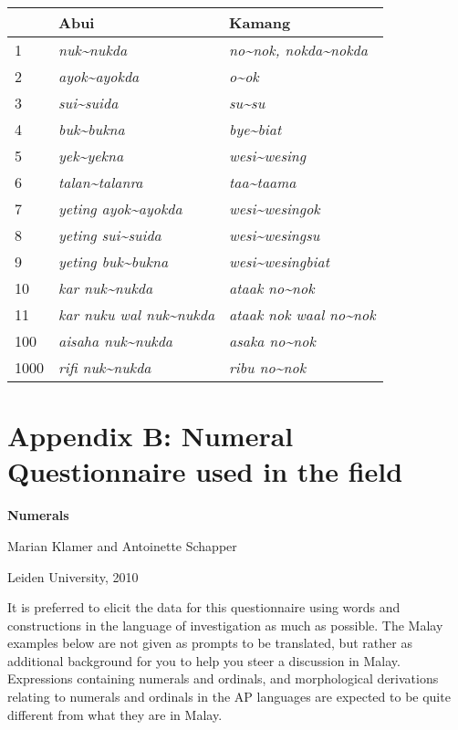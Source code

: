 \begin{center}
\tablehead{}
\begin{supertabular}{m{0.66775984in}m{2.0462599in}m{1.7038599in}}
\hline
 &
Abui &
Kamang\\ &
\textit{nuk\~{}nukda} &
\textit{no\~{}nok, nokda\~{}nokda}\\
2 &
\textit{ayok\~{}ayokda} &
\textit{o\~{}ok\ \ }\\
3 &
\textit{sui\~{}suida} &
\textit{su\~{}su}\\
4 &
\textit{buk\~{}bukna} &
\textit{bye\~{}biat}\\
5 &
\textit{yek\~{}yekna} &
\textit{wesi\~{}wesing}\\
6 &
\textit{talan\~{}talanra} &
\textit{taa\~{}taama}\\
7 &
\textit{yeting ayok\~{}ayokda} &
\textit{wesi\~{}wesingok}\\
8 &
\textit{yeting sui\~{}suida} &
\textit{wesi\~{}wesingsu}\\
9 &
\textit{yeting buk\~{}bukna} &
\textit{wesi\~{}wesingbiat}\\
10 &
\textit{kar nuk\~{}nukda} &
\textit{ataak no\~{}nok}\\
11 &
\textit{kar nuku wal nuk\~{}nukda} &
\textit{ataak nok waal no\~{}nok}\\
100 &
\textit{aisaha nuk}\textit{\~{}}\textit{nukda} &
\textit{asaka no}\textit{\~{}}\textit{nok}\\
1000 &
\textit{rifi nuk}\textit{\~{}}\textit{nukda} &
\textit{ribu no}\textit{\~{}}\textit{nok}\\\hline
\end{supertabular}
\end{center}
\clearpage\section[Appendix B: Numeral Questionnaire used in the field]{Appendix B: Numeral Questionnaire used in the field}
\hypertarget{RefHeading105264871885726}{}{\centering
\textbf{Numerals }
\par}

{\centering
Marian Klamer and Antoinette Schapper
\par}

{\centering
Leiden University, 2010
\par}

It is preferred to elicit the data for this questionnaire using words and constructions in the language of investigation as much as possible. The Malay examples below are not given as prompts to be translated, but rather as additional background for you to help you steer a discussion in Malay. Expressions containing numerals and ordinals, and morphological derivations relating to numerals and ordinals in the AP languages are expected to be quite different from what they are in Malay. 

